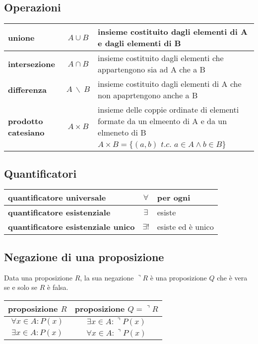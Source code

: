 \documentclass[a4paper]{article}
\begin{document}
\subsection{Operazioni}
\begin{center}
	\begin{tabularx}{\textwidth}{l c X}
		\textbf{unione} & \(A \cup B\) & insieme costituito dagli elementi di A e dagli elementi di B \\
		\midrule
		\textbf{intersezione} & \(A \cap B\) & insieme costituito dagli elementi che appartengono sia ad A che a B \\
		\midrule
		\textbf{differenza} & \(A \ \backslash \  B\) & insieme costituito dagli elementi di A che non apaprtengono anche a B \\
		\midrule
		\multirow{2}{*}{\textbf{prodotto catesiano}} & 	\multirow{2}{*}{\(A \times B\)} & insieme delle coppie ordinate di elementi formate da un elmeento di A e da un elmeneto di B \\
		& & \(A \times B = \{ (a, b) \textit{ t.c. } a \in A \land b \in B \}\)
	\end{tabularx}
\end{center}


\subsection{Quantificatori}
\begin{center}
	\begin{tabular}{l c l}
		\textbf{quantificatore universale} & \(\forall\) & per ogni \\
		\midrule
		\textbf{quantificatore esistenziale} & \(\exists\) & esiste \\
		\midrule
		\textbf{quantificatore esistenziale unico} & \(\exists!\) & esiste ed è unico
	\end{tabular}
\end{center}


\subsection{Negazione di una proposizione}
Data una proposizione \(R\), la sua negazione \(\urcorner R\) è una proposizione \(Q\) che è vera se e solo se \(R\) è falsa.

\begin{center}
	\begin{tabular}{c c}
		proposizione \(R\) & proposizione \(Q = \urcorner R\) \\
		\toprule
		\(\forall x \in A : P(x)\) & \(\exists x \in A : \urcorner P(x)\) \\
		\midrule
		\(\exists x \in A : P(x)\) & \(\forall x \in A : \urcorner P(x)\) \\
	\end{tabular}
\end{center}
\end{document}
